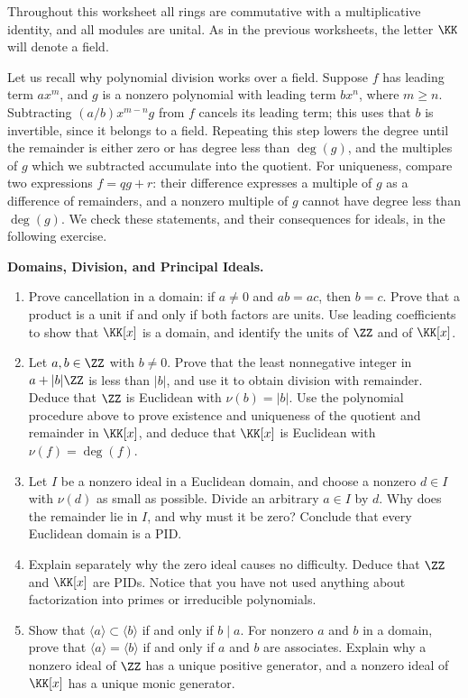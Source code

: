 \documentclass[12pt,reqno]{amsart}
\begin{document}
Throughout this worksheet all rings are commutative with a multiplicative identity, and all modules are unital. As in the previous worksheets, the letter $\KK$ will denote a field.

Let us recall why polynomial division works over a field. Suppose $f$ has leading term $ax^m$, and $g$ is a nonzero polynomial with leading term $bx^n$, where $m\geq n$. Subtracting $(a/b)x^{m-n}g$ from $f$ cancels its leading term; this uses that $b$ is invertible, since it belongs to a field. Repeating this step lowers the degree until the remainder is either zero or has degree less than $\deg(g)$, and the multiples of $g$ which we subtracted accumulate into the quotient. For uniqueness, compare two expressions $f=qg+r$: their difference expresses a multiple of $g$ as a difference of remainders, and a nonzero multiple of $g$ cannot have degree less than $\deg(g)$. We check these statements, and their consequences for ideals, in the following exercise.

\hrulefill

\begin{problems}
\item\label{s:division} \textbf{Domains, Division, and Principal Ideals.}
\begin{enumerate}
\item Prove cancellation in a domain: if $a\ne0$ and $ab=ac$, then $b=c$. Prove that a product is a unit if and only if both factors are units. Use leading coefficients to show that $\KK[x]$ is a domain, and identify the units of $\ZZ$ and of $\KK[x]$.
\item Let $a,b\in\ZZ$ with $b\ne0$. Prove that the least nonnegative integer in $a+|b|\ZZ$ is less than $|b|$, and use it to obtain division with remainder. Deduce that $\ZZ$ is Euclidean with $\nu(b)=|b|$. Use the polynomial procedure above to prove existence and uniqueness of the quotient and remainder in $\KK[x]$, and deduce that $\KK[x]$ is Euclidean with $\nu(f)=\deg(f)$.
\item Let $I$ be a nonzero ideal in a Euclidean domain, and choose a nonzero $d\in I$ with $\nu(d)$ as small as possible. Divide an arbitrary $a\in I$ by $d$. Why does the remainder lie in $I$, and why must it be zero? Conclude that every Euclidean domain is a PID.
\item Explain separately why the zero ideal causes no difficulty. Deduce that $\ZZ$ and $\KK[x]$ are PIDs. Notice that you have not used anything about factorization into primes or irreducible polynomials.
\item Show that $\langle a\rangle\subset\langle b\rangle$ if and only if $b\mid a$. For nonzero $a$ and $b$ in a domain, prove that $\langle a\rangle=\langle b\rangle$ if and only if $a$ and $b$ are associates. Explain why a nonzero ideal of $\ZZ$ has a unique positive generator, and a nonzero ideal of $\KK[x]$ has a unique monic generator.
\end{enumerate}
\end{problems}
\end{document}
